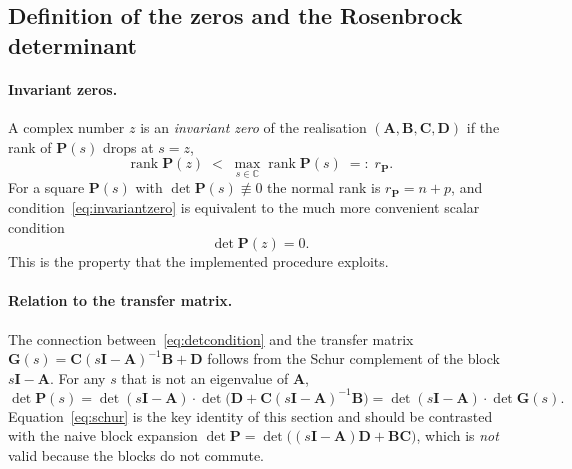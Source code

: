\subsection{Definition of the zeros and the Rosenbrock determinant}

\paragraph{Invariant zeros.} A complex number $z$ is an \emph{invariant zero} of the realisation
$(\mathbf{A},\mathbf{B},\mathbf{C},\mathbf{D})$ if the rank of $\mathbf{P}(s)$ drops at $s=z$,
\begin{equation}
    \operatorname{rank}\mathbf{P}(z) \;<\; \max_{s\in\mathbb{C}}\operatorname{rank}\mathbf{P}(s)
    \;=:\; r_{\mathbf{P}} .
    \label{eq:invariantzero}
\end{equation}
For a square $\mathbf{P}(s)$ with $\det\mathbf{P}(s)\not\equiv 0$ the normal rank is
$r_{\mathbf{P}}=n+p$, and condition~\eqref{eq:invariantzero} is equivalent to the much more
convenient scalar condition
\begin{equation}
    \det\mathbf{P}(z) = 0 .
    \label{eq:detcondition}
\end{equation}
This is the property that the implemented procedure exploits.

\paragraph{Relation to the transfer matrix.} The connection between~\eqref{eq:detcondition} and
the transfer matrix $\mathbf{G}(s)=\mathbf{C}(s\mathbf{I}-\mathbf{A})^{-1}\mathbf{B}+\mathbf{D}$
follows from the Schur complement of the block $s\mathbf{I}-\mathbf{A}$. For any $s$ that is not
an eigenvalue of $\mathbf{A}$,
\begin{equation}
    \det\mathbf{P}(s)
    = \det(s\mathbf{I}-\mathbf{A})\cdot
      \det\!\big(\mathbf{D}+\mathbf{C}(s\mathbf{I}-\mathbf{A})^{-1}\mathbf{B}\big)
    = \det(s\mathbf{I}-\mathbf{A})\cdot\det\mathbf{G}(s).
    \label{eq:schur}
\end{equation}
Equation~\eqref{eq:schur} is the key identity of this section and should be contrasted with the
naive block expansion $\det \mathbf{P} = \det\big((s\mathbf{I}-\mathbf{A})\mathbf{D}
+\mathbf{B}\mathbf{C}\big)$, which is \emph{not} valid because the blocks do not commute.


